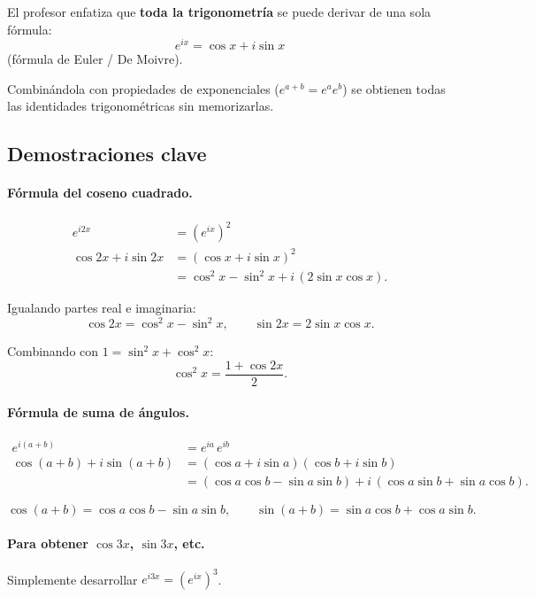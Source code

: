\documentclass[12pt,a4paper]{article}
\begin{document}
El profesor enfatiza que \textbf{toda la trigonometría} se puede
derivar de una sola fórmula:
\[
\boxed{e^{ix} = \cos x + i \sin x}
\]
(fórmula de Euler / De Moivre).

Combinándola con propiedades de exponenciales
(\(e^{a+b} = e^a e^b\)) se obtienen todas las identidades
trigonométricas sin memorizarlas.

\subsection{Demostraciones clave}

\paragraph{Fórmula del coseno cuadrado.}
\[
\begin{aligned}
e^{i2x} &= (e^{ix})^2 \\
\cos 2x + i\sin 2x &= (\cos x + i\sin x)^2 \\
&= \cos^2 x - \sin^2 x + i\,(2\sin x \cos x).
\end{aligned}
\]

Igualando partes real e imaginaria:
\[
\boxed{\cos 2x = \cos^2 x - \sin^2 x},\qquad
\boxed{\sin 2x = 2\sin x \cos x}.
\]

Combinando con \(1 = \sin^2 x + \cos^2 x\):
\[
\boxed{\cos^2 x = \frac{1 + \cos 2x}{2}}.
\]

\paragraph{Fórmula de suma de ángulos.}
\[
\begin{aligned}
e^{i(a+b)} &= e^{ia}\, e^{ib} \\
\cos(a+b) + i\sin(a+b) &= (\cos a + i\sin a)(\cos b + i\sin b) \\
&= (\cos a \cos b - \sin a \sin b)
   + i\,(\cos a \sin b + \sin a \cos b).
\end{aligned}
\]

\[
\boxed{\cos(a+b) = \cos a \cos b - \sin a \sin b},\qquad
\boxed{\sin(a+b) = \sin a \cos b + \cos a \sin b}.
\]

\paragraph{Para obtener \(\cos 3x\), \(\sin 3x\), etc.}
Simplemente desarrollar \(e^{i3x} = (e^{ix})^3\).
\end{document}
